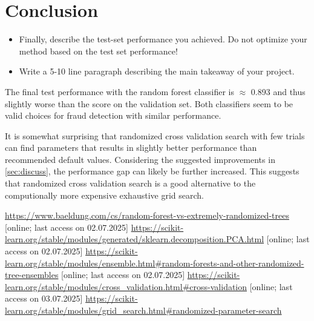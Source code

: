 \documentclass[a4, 10 pt, conference]{ieeeconf}  %
\begin{document}
\section{Conclusion}
\label{sec:con}

{\color{blue}

  \begin{itemize}
  \item Finally, describe the test-set performance you achieved. Do not
    optimize your method based on the test set performance!
  \item Write a 5-10 line paragraph describing the main takeaway of your project.
  \end{itemize}

}

The final test performance with the random forest classifier is $\approx$ 0.893 and thus slightly worse than the score on the validation set. Both classifiers seem to be valid choices for fraud detection with similar performance.

It is somewhat surprising that randomized cross validation search with few trials can find parameters that results in slightly better performance than recommended default values. Considering the suggested improvements in \ref{sec:discuss}, the performance gap can likely be further increased. This suggests that randomized cross validation search is a good alternative to the computionally more expensive exhaustive grid search.

\begin{thebibliography}{xxxx}
	 \url{https://www.baeldung.com/cs/random-forest-vs-extremely-randomized-trees} [online; last access on 02.07.2025]
	 \url{https://scikit-learn.org/stable/modules/generated/sklearn.decomposition.PCA.html} [online; last access on 02.07.2025]
	 \url{https://scikit-learn.org/stable/modules/ensemble.html#random-forests-and-other-randomized-tree-ensembles} [online; last access on 02.07.2025]
	 \url{https://scikit-learn.org/stable/modules/cross_validation.html#cross-validation} [online; last access on 03.07.2025]
	 \url{https://scikit-learn.org/stable/modules/grid_search.html#randomized-parameter-search}
\end{thebibliography}
\end{document}
